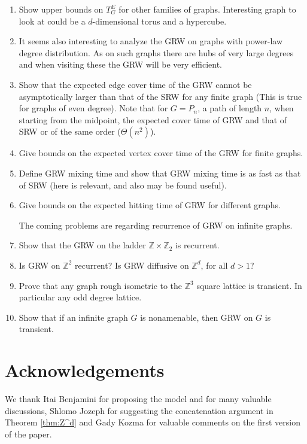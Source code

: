 \documentclass[12pt,a4paper]{article}
\newcommand{\0}{{\bf 0}}
\newcommand{\Z}{{\mathbb Z}}
\newcommand{\enumlist}[1]{\begin{enumerate}#1\end{enumerate}}
\begin{document}
    \enumlist{
    \item
        Show upper bounds on $T^E_G$ for other families of graphs.
        Interesting graph to look at could be a $d$-dimensional torus and a hypercube.

    \item
        It seems also interesting to analyze the GRW on graphs with power-law degree distribution. As on such graphs there are hubs
        of very large degrees and when visiting these the GRW will be very efficient.

    \item
        Show that the expected edge cover time of the GRW cannot be asymptotically larger than that of the SRW for any finite graph
        (This is true for graphs of even degree).
        Note that for $G = P_n$, a path of length $n$, when starting from the midpoint, the expected cover time of GRW
        and that of SRW or of the same order ($\Theta(n^2)$).

    \item
        Give bounds on the expected vertex cover time of the GRW for finite graphs.

    \item
        Define GRW mixing time and show that GRW mixing time is as fast as that of SRW (here \cite{ABLS06} is relevant, and also \cite{Madras2005} may be found useful).

    \item
        Give bounds on the expected hitting time of GRW for different graphs.


\bigskip
\noindent
The coming problems are regarding recurrence of GRW on infinite graphs.



    \item
        Show that the GRW on the ladder $\Z \times \Z_2$ is recurrent.

    \item
        Is GRW on $\Z^2$ recurrent? Is GRW diffusive on $\Z^d$, for all $d >1$?

    \item
        Prove that any graph rough isometric to the $\Z^3$ square lattice is transient. In particular any odd degree lattice.


    \item
        Show that if an infinite graph $G$ is nonamenable, then GRW on $G$ is transient.
 }

\section{Acknowledgements}
    We thank Itai Benjamini for proposing the model and for many valuable discussions,
    Shlomo Jozeph for suggesting the concatenation argument in Theorem \ref{thm:Z^d} and Gady Kozma for valuable comments on the first version of the paper.
\end{document}

